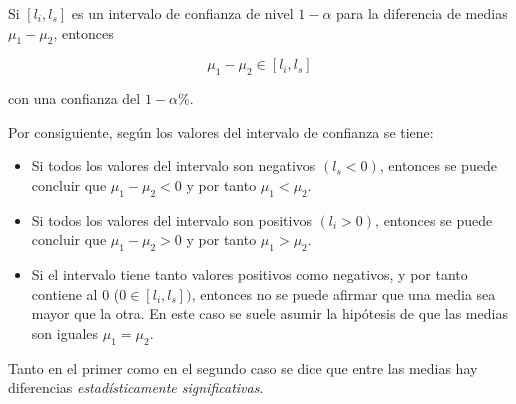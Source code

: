 \documentclass[
  a4paper,
]{scrreport}
\providecommand{\tightlist}{%
  \setlength{\itemsep}{0pt}\setlength{\parskip}{0pt}}\usepackage{longtable,booktabs,array}
\theoremstyle{definition}
\theoremstyle{definition}
\theoremstyle{plain}
\theoremstyle{remark}
\begin{document}
Si \([l_i,l_s]\) es un intervalo de confianza de nivel \(1-\alpha\) para
la diferencia de medias \(\mu_1-\mu_2\), entonces

\[
\mu_1-\mu_2 \in [l_i,l_s]
\]

con una confianza del \(1-\alpha\%\).

Por consiguiente, según los valores del intervalo de confianza se tiene:

\begin{itemize}
\tightlist
\item
  Si todos los valores del intervalo son negativos \((l_s<0)\), entonces
  se puede concluir que \(\mu_1-\mu_2<0\) y por tanto \(\mu_1<\mu_2\).
\item
  Si todos los valores del intervalo son positivos \((l_i>0)\), entonces
  se puede concluir que \(\mu_1-\mu_2>0\) y por tanto \(\mu_1>\mu_2\).
\item
  Si el intervalo tiene tanto valores positivos como negativos, y por
  tanto contiene al 0 (\(0\in [l_i,l_s])\), entonces no se puede afirmar
  que una media sea mayor que la otra. En este caso se suele asumir la
  hipótesis de que las medias son iguales \(\mu_1=\mu_2\).
\end{itemize}

Tanto en el primer como en el segundo caso se dice que entre las medias
hay diferencias \emph{estadísticamente significativas}.
\end{document}

